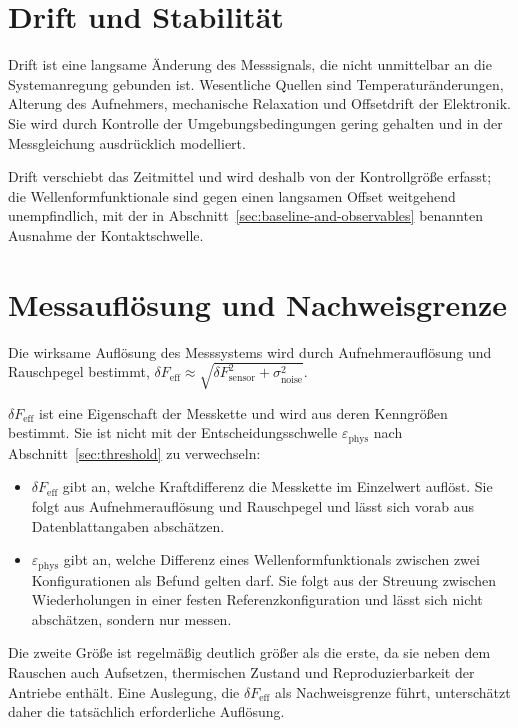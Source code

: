 \documentclass[12pt,a4paper]{report}
\begin{document}
\section{Drift und Stabilität}

Drift ist eine langsame Änderung des Messsignals, die nicht unmittelbar
an die Systemanregung gebunden ist. Wesentliche Quellen sind
Temperaturänderungen, Alterung des Aufnehmers, mechanische Relaxation
und Offsetdrift der Elektronik. Sie wird durch Kontrolle der
Umgebungsbedingungen gering gehalten und in der Messgleichung
ausdrücklich modelliert.

Drift verschiebt das Zeitmittel und wird deshalb von der Kontrollgröße
erfasst; die Wellenformfunktionale sind gegen einen langsamen Offset
weitgehend unempfindlich, mit der in
Abschnitt~\ref{sec:baseline-and-observables} benannten Ausnahme der
Kontaktschwelle.

\section{Messauflösung und Nachweisgrenze}

Die wirksame Auflösung des Messsystems wird durch Aufnehmerauflösung und
Rauschpegel bestimmt,
$\delta F_{\text{eff}} \approx \sqrt{\delta F_{\text{sensor}}^2 + \sigma_{\text{noise}}^2}$.

$\delta F_{\text{eff}}$ ist eine Eigenschaft der Messkette und wird aus
deren Kenngrößen bestimmt. Sie ist nicht mit der Entscheidungsschwelle
$\varepsilon_{\mathrm{phys}}$ nach Abschnitt~\ref{sec:threshold} zu
verwechseln:

\begin{itemize}
\item $\delta F_{\text{eff}}$ gibt an, welche Kraftdifferenz die
      Messkette im Einzelwert auflöst. Sie folgt aus Aufnehmerauflösung
      und Rauschpegel und lässt sich vorab aus Datenblattangaben
      abschätzen.
\item $\varepsilon_{\mathrm{phys}}$ gibt an, welche Differenz eines
      Wellenformfunktionals zwischen zwei Konfigurationen als Befund
      gelten darf. Sie folgt aus der Streuung zwischen Wiederholungen in
      einer festen Referenzkonfiguration und lässt sich nicht
      abschätzen, sondern nur messen.
\end{itemize}

Die zweite Größe ist regelmäßig deutlich größer als die erste, da sie
neben dem Rauschen auch Aufsetzen, thermischen Zustand und
Reproduzierbarkeit der Antriebe enthält. Eine Auslegung, die
$\delta F_{\text{eff}}$ als Nachweisgrenze führt, unterschätzt daher die
tatsächlich erforderliche Auflösung.
\end{document}
